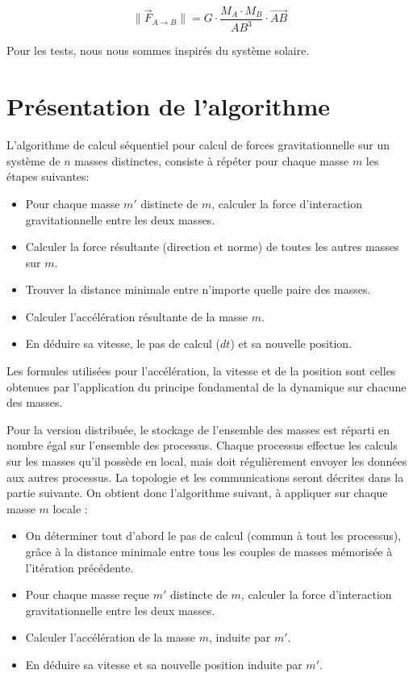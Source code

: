 \documentclass[a4paper,11pt]{article}
\begin{document}
\[
\| \vec{F}_{A\rightarrow B} \| = G \cdot \frac{M_A \cdot M_B}{\mathit{AB^3}} \cdot \mathit{\vec{AB}}
\]

Pour les tests, nous nous sommes inspirés du système solaire.

\section{Présentation de l'algorithme}
L'algorithme de calcul séquentiel pour calcul de forces gravitationnelle sur un système de $n$ masses distinctes, consiste à répéter pour chaque masse $m$ les étapes suivantes:

\begin{itemize}
\item Pour chaque masse $m'$ distincte de $m$, calculer la force d'interaction gravitationnelle entre les deux masses.
\item Calculer la force résultante (direction et norme) de toutes les autres masses sur $m$.
\item Trouver la distance minimale entre n'importe quelle paire des masses.
\item Calculer l'accélération résultante de la masse $m$.
\item En déduire sa vitesse, le pas de calcul ($dt$) et sa nouvelle position.
\end{itemize}

Les formules utilisées pour l'accélération, la vitesse et de la position sont celles obtenues par l'application du principe fondamental de la dynamique sur chacune des masses.

Pour la version distribuée,%
le stockage de l'ensemble des masses est réparti en nombre égal sur l'ensemble des processus. Chaque processus effectue les calculs sur les masses qu'il possède en local, mais doit régulièrement envoyer les données aux autres processus. La topologie et les communications seront décrites dans la partie suivante. On obtient donc l'algorithme suivant, à appliquer sur chaque masse $m$ locale :
\begin{itemize}
\item On déterminer tout d'abord le pas de calcul (commun à tout les processus), grâce à la distance minimale entre tous les couples de masses mémorisée à l'itération précédente.
\item Pour chaque masse  reçue $m'$ distincte de $m$, calculer la force d'interaction gravitationnelle entre les deux masses.
\item Calculer l'accélération de la masse $m$, induite par $m'$.
\item En déduire sa vitesse et sa nouvelle position induite par $m'$.
\end{itemize}
\end{document}

